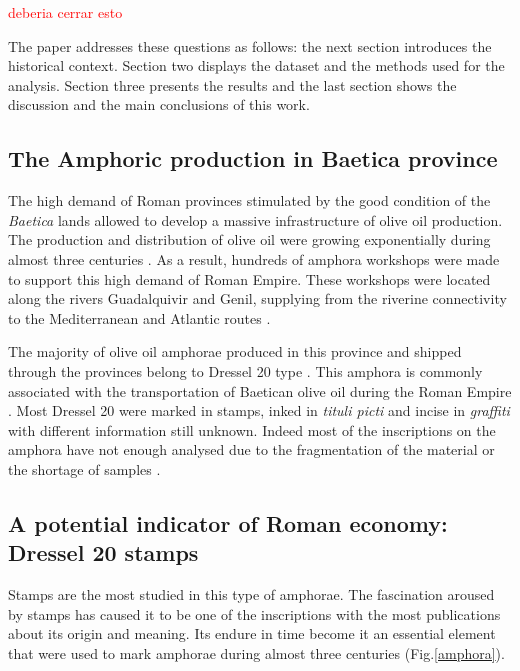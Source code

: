 \documentclass[review]{elsarticle}
\newcommand{\memo}[2]{\textcolor{#1}{#2}}
\newcommand{\maria}[1]{\memo{red}{#1\\}}
\begin{document}
\maria{deberia cerrar esto}

The paper addresses these questions as follows: the next section introduces the historical context. Section two displays the dataset and the methods used for the analysis. Section three presents the results and the last section shows the discussion and the main conclusions of this work. 
 

\subsection{The Amphoric production in Baetica province}


The high demand of Roman provinces stimulated by the good condition of the \textit{Baetica} lands allowed to develop a massive infrastructure of olive oil production. The production and distribution of olive oil were growing exponentially during almost three centuries \citep{remesal_concierto}. As a result, hundreds of amphora workshops were made to support this high demand of Roman Empire. These workshops were located along the rivers Guadalquivir and Genil, supplying from the riverine connectivity to the Mediterranean and Atlantic routes \citep{garcia_vargas_enrique_formal_2010}.

The majority of olive oil amphorae produced in this province and shipped through the provinces belong to Dressel 20 type \citep{dressel_ricerche_1878,
millet_anforas_1998}. This amphora is commonly associated with the transportation of Baetican olive oil during the Roman Empire \citep{berni_millet_epigrafianforica_2008}. Most Dressel 20 were marked in stamps, inked in \textit{tituli picti} and incise in \textit{graffiti} with different information still unknown. Indeed most of the inscriptions on the amphora have not enough analysed due to the fragmentation of the material or the shortage of samples \citep{aguilera_evolucion_2007,rovira_guardiola_grafitos_2007}. 


\subsection{A potential indicator of Roman economy: Dressel 20 stamps}

Stamps are the most studied in this type of amphorae. The fascination aroused by stamps has caused it to be one of the inscriptions with the most publications about its origin and meaning. Its endure in time become it an essential element that were used to mark amphorae during almost three centuries \citep{remesal_sellar_2016} (Fig.\ref{amphora}). 
\end{document}
